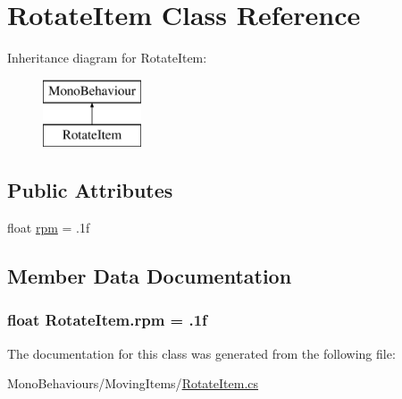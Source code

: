 \hypertarget{class_rotate_item}{}\section{Rotate\+Item Class Reference}
\label{class_rotate_item}
Inheritance diagram for Rotate\+Item\+:\begin{figure}[H]
\begin{center}
\leavevmode
\includegraphics[height=2.000000cm]{class_rotate_item}
\end{center}
\end{figure}
\subsection*{Public Attributes}
\begin{DoxyCompactItemize}
\item 
float \hyperlink{class_rotate_item_abade37d55c3e464bc4be43e86c452f8e}{rpm} = .\+1f
\end{DoxyCompactItemize}


\subsection{Member Data Documentation}
\subsubsection[{\texorpdfstring{rpm}{rpm}}]{\setlength{\rightskip}{0pt plus 5cm}float Rotate\+Item.\+rpm = .\+1f}\hypertarget{class_rotate_item_abade37d55c3e464bc4be43e86c452f8e}{}\label{class_rotate_item_abade37d55c3e464bc4be43e86c452f8e}


The documentation for this class was generated from the following file\+:\begin{DoxyCompactItemize}
\item 
Mono\+Behaviours/\+Moving\+Items/\hyperlink{_rotate_item_8cs}{Rotate\+Item.\+cs}\end{DoxyCompactItemize}
